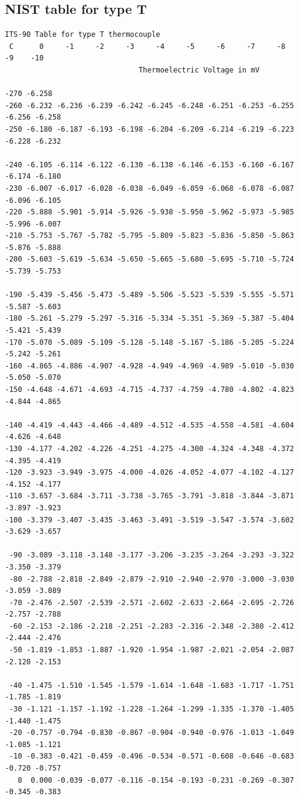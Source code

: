 \documentclass[paper=a4, fontsize=11pt, abstract=on]{scrartcl}
\numberwithin{equation}{section}		%
\numberwithin{figure}{section}			%
\numberwithin{table}{section}				%
\begin{document}
\subsection{NIST table for type T}
\begin{lstlisting}
ITS-90 Table for type T thermocouple                                            
 C      0     -1     -2     -3     -4     -5     -6     -7     -8     -9    -10 
                               Thermoelectric Voltage in mV                      
 
-270 -6.258
-260 -6.232 -6.236 -6.239 -6.242 -6.245 -6.248 -6.251 -6.253 -6.255 -6.256 -6.258
-250 -6.180 -6.187 -6.193 -6.198 -6.204 -6.209 -6.214 -6.219 -6.223 -6.228 -6.232
 
-240 -6.105 -6.114 -6.122 -6.130 -6.138 -6.146 -6.153 -6.160 -6.167 -6.174 -6.180
-230 -6.007 -6.017 -6.028 -6.038 -6.049 -6.059 -6.068 -6.078 -6.087 -6.096 -6.105
-220 -5.888 -5.901 -5.914 -5.926 -5.938 -5.950 -5.962 -5.973 -5.985 -5.996 -6.007
-210 -5.753 -5.767 -5.782 -5.795 -5.809 -5.823 -5.836 -5.850 -5.863 -5.876 -5.888
-200 -5.603 -5.619 -5.634 -5.650 -5.665 -5.680 -5.695 -5.710 -5.724 -5.739 -5.753
 
-190 -5.439 -5.456 -5.473 -5.489 -5.506 -5.523 -5.539 -5.555 -5.571 -5.587 -5.603
-180 -5.261 -5.279 -5.297 -5.316 -5.334 -5.351 -5.369 -5.387 -5.404 -5.421 -5.439
-170 -5.070 -5.089 -5.109 -5.128 -5.148 -5.167 -5.186 -5.205 -5.224 -5.242 -5.261
-160 -4.865 -4.886 -4.907 -4.928 -4.949 -4.969 -4.989 -5.010 -5.030 -5.050 -5.070
-150 -4.648 -4.671 -4.693 -4.715 -4.737 -4.759 -4.780 -4.802 -4.823 -4.844 -4.865
 
-140 -4.419 -4.443 -4.466 -4.489 -4.512 -4.535 -4.558 -4.581 -4.604 -4.626 -4.648
-130 -4.177 -4.202 -4.226 -4.251 -4.275 -4.300 -4.324 -4.348 -4.372 -4.395 -4.419
-120 -3.923 -3.949 -3.975 -4.000 -4.026 -4.052 -4.077 -4.102 -4.127 -4.152 -4.177
-110 -3.657 -3.684 -3.711 -3.738 -3.765 -3.791 -3.818 -3.844 -3.871 -3.897 -3.923
-100 -3.379 -3.407 -3.435 -3.463 -3.491 -3.519 -3.547 -3.574 -3.602 -3.629 -3.657
 
 -90 -3.089 -3.118 -3.148 -3.177 -3.206 -3.235 -3.264 -3.293 -3.322 -3.350 -3.379
 -80 -2.788 -2.818 -2.849 -2.879 -2.910 -2.940 -2.970 -3.000 -3.030 -3.059 -3.089
 -70 -2.476 -2.507 -2.539 -2.571 -2.602 -2.633 -2.664 -2.695 -2.726 -2.757 -2.788
 -60 -2.153 -2.186 -2.218 -2.251 -2.283 -2.316 -2.348 -2.380 -2.412 -2.444 -2.476
 -50 -1.819 -1.853 -1.887 -1.920 -1.954 -1.987 -2.021 -2.054 -2.087 -2.120 -2.153
 
 -40 -1.475 -1.510 -1.545 -1.579 -1.614 -1.648 -1.683 -1.717 -1.751 -1.785 -1.819
 -30 -1.121 -1.157 -1.192 -1.228 -1.264 -1.299 -1.335 -1.370 -1.405 -1.440 -1.475
 -20 -0.757 -0.794 -0.830 -0.867 -0.904 -0.940 -0.976 -1.013 -1.049 -1.085 -1.121
 -10 -0.383 -0.421 -0.459 -0.496 -0.534 -0.571 -0.608 -0.646 -0.683 -0.720 -0.757
   0  0.000 -0.039 -0.077 -0.116 -0.154 -0.193 -0.231 -0.269 -0.307 -0.345 -0.383
 

\end{lstlisting}
\end{document}
